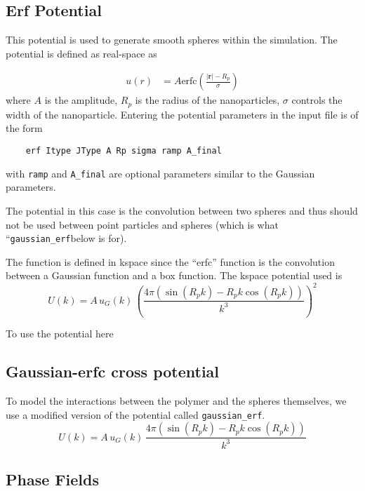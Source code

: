 \documentclass[12pt]{article}
\begin{document}
\subsection{Erf Potential}
\label{sec:erf}


This potential is used to generate smooth spheres within the simulation. The potential is defined as real-space as 

\begin{eqnarray}
	u(r) &= A \text{erfc}
	\left(
		\frac{\vert \mathbf{r} \vert - R_p}{\sigma}
	\right)
\end{eqnarray}
where $A$ is the amplitude, $R_p$ is the radius of the nanoparticles, $\sigma$ controls the width of the nanoparticle. 
Entering the potential parameters in the input file is of the form 
\begin{verbatim}
	erf Itype JType A Rp sigma ramp A_final
\end{verbatim}
with \verb+ramp+ and \verb+A_final+ are optional parameters similar to the Gaussian parameters. 

The potential in this case is the convolution between two spheres and thus should not be used between point particles and spheres (which is what ``\verb+gaussian_erf+below is for).

The function is defined in kspace since the ``erfc'' function is the convolution between a Gaussian function and a box function. The kspace potential used is 
\begin{equation}
	U(k) = A \, u_G(k) \,\left( \frac{4\pi (\sin(R_p k) - R_p k \cos(R_p k) )}{k^3}\right)^2
\end{equation}


To use the potential here 
\subsection{Gaussian-erfc cross potential}
To model the interactions between the polymer and the spheres themselves, we use a modified version of the potential called \verb+gaussian_erf+.
\begin{equation}
	U(k) = A \, u_G(k) \, \frac{4\pi (\sin(R_p k) - R_p k \cos(R_p k) )}{k^3}
\end{equation}






\subsection{Phase Fields}
\label{sec:fieldphase}
\end{document}
